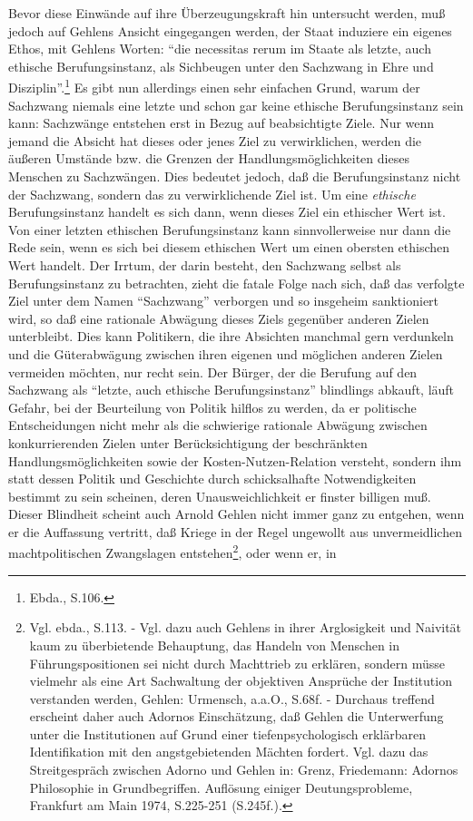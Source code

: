 \documentclass[12pt,a4paper]{article}
\begin{document}
Bevor diese Einwände auf ihre Überzeugungskraft hin untersucht werden,
muß jedoch auf Gehlens Ansicht eingegangen werden, der Staat induziere
ein eigenes Ethos, mit Gehlens Worten: "`die necessitas rerum im
Staate als letzte, auch ethische Berufungsinstanz, als Sichbeugen
unter den Sachzwang in Ehre und Disziplin"'.\footnote{Ebda., S.106.}
Es gibt nun allerdings einen sehr einfachen Grund, warum der Sachzwang
niemals eine letzte und schon gar keine ethische Berufungsinstanz sein
kann: Sachzwänge entstehen erst in Bezug auf beabsichtigte Ziele. Nur
wenn jemand die Absicht hat dieses oder jenes Ziel zu verwirklichen,
werden die äußeren Umstände bzw. die Grenzen der
Handlungsmöglichkeiten dieses Menschen zu Sachzwängen. Dies bedeutet
jedoch, daß die Berufungsinstanz nicht der Sachzwang, sondern das zu
verwirklichende Ziel ist. Um eine {\em ethische} Berufungsinstanz
handelt es sich dann, wenn dieses Ziel ein ethischer Wert ist. Von
einer letzten ethischen Berufungsinstanz kann sinnvollerweise nur dann
die Rede sein, wenn es sich bei diesem ethischen Wert um einen
obersten ethischen Wert handelt. Der Irrtum, der darin besteht, den
Sachzwang selbst als Berufungsinstanz zu betrachten, zieht die fatale
Folge nach sich, daß das verfolgte Ziel unter dem Namen "`Sachzwang"'
verborgen und so insgeheim sanktioniert wird, so daß eine rationale
Abwägung dieses Ziels gegenüber anderen Zielen unterbleibt.  Dies kann
Politikern, die ihre Absichten manchmal gern verdunkeln und die
Güterabwägung zwischen ihren eigenen und möglichen anderen Zielen
vermeiden möchten, nur recht sein. Der Bürger, der die Berufung auf
den Sachzwang als "`letzte, auch ethische Berufungsinstanz"'
blindlings abkauft, läuft Gefahr, bei der Beurteilung von Politik
hilflos zu werden, da er politische Entscheidungen nicht mehr als die
schwierige rationale Abwägung zwischen konkurrierenden Zielen unter
Berücksichtigung der beschränkten Handlungsmöglichkeiten sowie der
Kosten-Nutzen-Relation versteht, sondern ihm statt dessen Politik und
Geschichte durch schicksalhafte Notwendigkeiten bestimmt zu sein
scheinen, deren Unausweichlichkeit er finster billigen muß.  Dieser
Blindheit scheint auch Arnold Gehlen nicht immer ganz zu entgehen,
wenn er die Auffassung vertritt, daß Kriege in der Regel ungewollt aus
unvermeidlichen machtpolitischen Zwangslagen entstehen\footnote{Vgl.
  ebda., S.113. - Vgl. dazu auch Gehlens in ihrer Arglosigkeit und
  Naivität kaum zu überbietende Behauptung, das Handeln von Menschen
  in Führungspositionen sei nicht durch Machttrieb zu erklären,
  sondern müsse vielmehr als eine Art Sachwaltung der objektiven
  Ansprüche der Institution verstanden werden, Gehlen: Urmensch,
  a.a.O., S.68f. - Durchaus treffend erscheint daher auch Adornos
  Einschätzung, daß Gehlen die Unterwerfung unter die Institutionen
  auf Grund einer tiefenpsychologisch erklärbaren Identifikation mit
  den angstgebietenden Mächten fordert. Vgl. dazu das Streitgespräch
  zwischen Adorno und Gehlen in: Grenz, Friedemann: Adornos
  Philosophie in Grundbegriffen. Auflösung einiger Deutungsprobleme,
  Frankfurt am Main 1974, S.225-251 (S.245f.).}, oder wenn er, in
\end{document}

